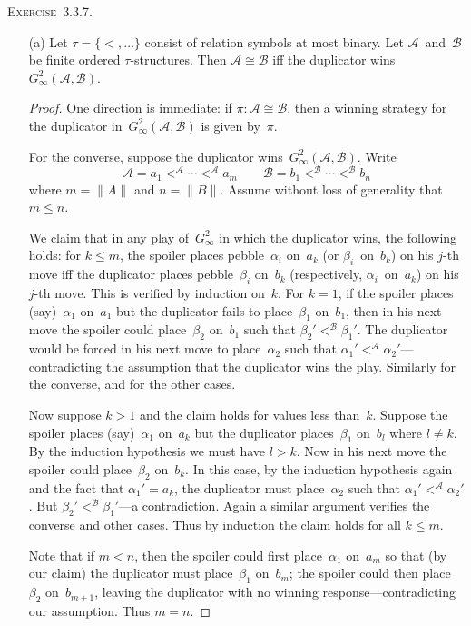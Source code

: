\documentclass[letterpaper]{article}
\newcommand{\A}{\mathcal{A}}
\newcommand{\B}{\mathcal{B}}
\newcommand{\iso}{\cong}
\newcommand{\card}[1]{\|{#1}\|}
\newcommand{\exercise}[1]{\noindent\textsc{Exercise~{#1}.}}
\theoremstyle{plain}
\begin{document}
\exercise{3.3.7}
\begin{enumerate}
\item[(a)] Let $\tau=\{<,\ldots\}$ consist of relation symbols at most binary. Let $\A$~and~$\B$ be finite ordered $\tau$-structures. Then $\A\iso\B$ iff the duplicator wins~$G_{\infty}^2(\A,\B)$.
\begin{proof}
One direction is immediate: if $\pi:\A\iso\B$, then a winning strategy for the duplicator in~$G_{\infty}^2(\A,\B)$ is given by~$\pi$.

For the converse, suppose the duplicator wins~$G_{\infty}^2(\A,\B)$. Write
$$\A=a_1<^{\A}\cdots<^{\A}a_m\qquad \B=b_1<^{\B}\cdots<^{\B}b_n$$
where $m=\card{A}$ and $n=\card{B}$. Assume without loss of generality that $m\le n$.

We claim that in any play of~$G_{\infty}^2$ in which the duplicator wins, the following holds: for $k\le m$, the spoiler places pebble~$\alpha_i$ on~$a_k$ (or $\beta_i$~on~$b_k$) on his $j$-th move iff the duplicator places pebble~$\beta_i$ on~$b_k$ (respectively, $\alpha_i$~on~$a_k$) on his $j$-th move. This is verified by induction on~$k$. For $k=1$, if the spoiler places (say)~$\alpha_1$ on~$a_1$ but the duplicator fails to place~$\beta_1$ on~$b_1$, then in his next move the spoiler could place~$\beta_2$ on~$b_1$ such that $\beta_2'<^{\B}\beta_1'$. The duplicator would be forced in his next move to place~$\alpha_2$ such that $\alpha_1'<^{\A}\alpha_2'$---contradicting the assumption that the duplicator wins the play. Similarly for the converse, and for the other cases.

Now suppose $k>1$ and the claim holds for values less than~$k$. Suppose the spoiler places (say)~$\alpha_1$ on~$a_k$ but the duplicator places~$\beta_1$ on~$b_l$ where $l\ne k$. By the induction hypothesis we must have $l>k$. Now in his next move the spoiler could place~$\beta_2$ on~$b_k$. In this case, by the induction hypothesis again and the fact that $\alpha_1'=a_k$, the duplicator must place~$\alpha_2$ such that $\alpha_1'<^{\A}\alpha_2'$. But $\beta_2'<^{\B}\beta_1'$---a contradiction. Again a similar argument verifies the converse and other cases. Thus by induction the claim holds for all $k\le m$.

Note that if $m<n$, then the spoiler could first place~$\alpha_1$ on~$a_m$ so that (by our claim) the duplicator must place~$\beta_1$ on~$b_m$; the spoiler could then place~$\beta_2$ on~$b_{m+1}$, leaving the duplicator with no winning response---contradicting our assumption. Thus $m=n$.


\end{proof}
\end{enumerate}
\end{document}
